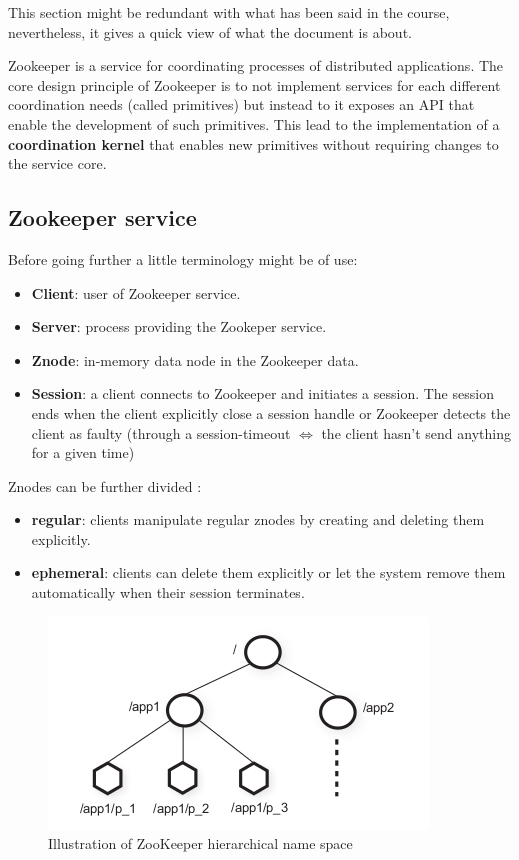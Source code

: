 
This section might be redundant with what has been said in the course, nevertheless, it gives a quick view of what the document is about.

Zookeeper is a service for coordinating processes of distributed applications. The core design principle of Zookeeper is to not implement services for each different coordination needs (called primitives) but instead to it exposes an API that enable the development of such primitives. This lead to the implementation of a \textbf{coordination kernel} that enables new primitives without requiring changes to the service core.

\subsection{Zookeeper service}

Before going further a little terminology might be of use:
\begin{itemize}
\item \textbf{Client}: user of Zookeeper service.
\item \textbf{Server}: process providing the Zookeper service.
\item \textbf{Znode}: in-memory data node in the Zookeeper data.
\item \textbf{Session}: a client connects to Zookeeper and initiates a session. The session ends when the client explicitly close a session handle or Zookeeper detects the client as faulty (through a session-timeout $\Leftrightarrow$ the client hasn't send anything for a given time)
\end{itemize}

Znodes can be further divided : 

\begin{itemize}
	\item \textbf{regular}: clients manipulate regular znodes by creating and deleting them explicitly.
	\item \textbf{ephemeral}: clients can delete them explicitly or let the system remove them automatically when their session terminates.
\end{itemize}

\begin{figure}
	\begin{center}
		\includegraphics[scale=1]{img/hierachicalZookeeper.png}
	\end{center}
	\caption{Illustration of ZooKeeper hierarchical name space}
	\label{hierarchicalname}
\end{figure}

